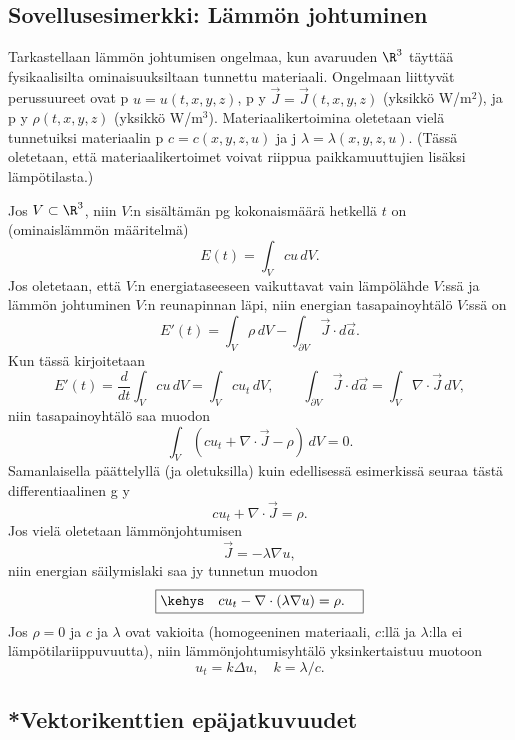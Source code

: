 \subsection*{Sovellusesimerkki: Lämmön johtuminen}

Tarkastellaan lämmön johtumisen ongelmaa, kun avaruuden $\R^3$ täyttää fysikaalisilta 
ominaisuuksiltaan tunnettu materiaali. Ongelmaan liittyvät perussuureet ovat
p $u=u(t,x,y,z)$, p y 
$\vec J=\vec J(t,x,y,z)$ (yksikkö W/m$^2$), ja p y 
$\rho(t,x,y,z)$ (yksikkö W/m$^3$). Materiaalikertoimina oletetaan vielä tunnetuiksi materiaalin 
p $c=c(x,y,z,u)$ ja j 
$\lambda=\lambda(x,y,z,u)$. (Tässä oletetaan, että materiaalikertoimet voivat riippua 
paikkamuuttujien lisäksi lämpötilasta.)

Jos $V\subset\R^3$, niin $V$:n sisältämän pg kokonaismäärä
hetkellä $t$ on (ominaislämmön määritelmä)
\[
E(t)=\int_V cu\,dV.
\]
Jos oletetaan, että $V$:n energiataseeseen vaikuttavat vain lämpölähde $V$:ssä ja lämmön
johtuminen $V$:n reunapinnan läpi, niin energian tasapainoyhtälö $V$:ssä on
\[
E'(t)= \int_V \rho\,dV - \int_{\partial V} \vec J\cdot d\vec a.
\]
Kun tässä kirjoitetaan
\[
E'(t)=\frac{d}{dt}\int_V cu\,dV = \int_V cu_t\,dV, \qquad
      \int_{\partial V} \vec J\cdot d\vec a = \int_V \nabla\cdot\vec J\,dV,
\]
niin tasapainoyhtälö saa muodon
\[
\int_V (cu_t+\nabla\cdot\vec J-\rho)\,dV = 0.
\]
Samanlaisella päättelyllä (ja oletuksilla) kuin edellisessä esimerkissä seuraa tästä 
differentiaalinen g y
\[
cu_t+\nabla\cdot\vec J = \rho.
\]
Jos vielä oletetaan lämmönjohtumisen  
%
\[
\vec J = -\lambda \nabla u,
\]
%
niin energian säilymislaki saa jy tunnetun muodon
\[
\boxed{\kehys\quad cu_t-\nabla\cdot(\lambda\nabla u)=\rho. \quad}
\]
Jos $\rho=0$ ja $c$ ja $\lambda$ ovat vakioita (homogeeninen materiaali, $c$:llä ja
$\lambda$:lla ei lämpötilariippuvuutta), niin lämmönjohtumisyhtälö yksinkertaistuu muotoon
\[
u_t=k\Delta u, \quad k=\lambda/c.
\]
 
\subsection*{*Vektorikenttien epäjatkuvuudet}

